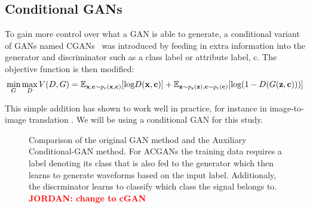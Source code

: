 \documentclass[12pt]{iopart}
\newcommand{\jordan}[1]{\textbf{\textcolor{red}{JORDAN: #1}}}
\newcommand{\chris}[1]{\textbf{\textcolor{green}{CHRIS: #1}}}
\begin{document}
\subsection{Conditional GANs}

%
To gain more control over what a GAN is able to generate, a conditional variant of \acp{GAN} named \acp{CGAN}~\cite{cgan} was introduced by feeding in extra information into the generator and discriminator such as a class label or attribute label, c. The objective function is then modified:
\begin{equation}
\mathop{\text{min}}_{G}  \mathop{\text{max}}_{D} V(D,G) = \mathbb{E}_{\mathbf{x,c} \sim p_{\text{r}}(\mathbf{x,c})} [\text{log} D(\mathbf{x,c})] \\ + \mathbb{E}_{\mathbf{z} \sim p_{\text{z}}(\mathbf{z}),\mathbf{c} \sim p_{\text{r}}(\mathbf{c})} [\text{log}(1-D(G(\mathbf{z,c})))]
\label{equation:cGANloss}
\end{equation}

This simple addition has shown to work well in practice, for instance in image-to-image translation \cite{isola2016imagetoimage}. We will be using a conditional GAN for this study.
%

%

\begin{figure}
    \centering
    \caption{Comparison of the original GAN method and the Auxiliary
Conditional-GAN method. For ACGANs the training data requires a label denoting
its class that is also fed to the generator which then learns to generate
waveforms based on the input label. Additionaly, the discrminator learns to
classify which class the signal belongs to. \jordan{change to cGAN}} \label{fig:gan_comparison}
\end{figure}
\end{document}
